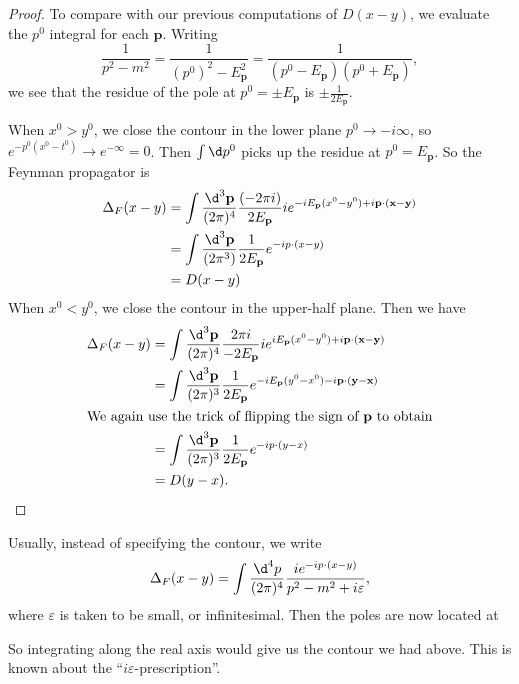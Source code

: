 \documentclass[a4paper]{article}
\begin{document}
\begin{proof}
  To compare with our previous computations of $D(x - y)$, we evaluate the $p^0$ integral for each $\mathbf{p}$. Writing
  \[
    \frac{1}{p^2 - m^2} = \frac{1}{(p^0)^2 - E_\mathbf{p}^2} = \frac{1}{(p^0 - E_\mathbf{p})(p^0 + E_\mathbf{p})},
  \]
  we see that the residue of the pole at $p^0 = \pm E_\mathbf{p}$ is $\pm \frac{1}{2E_\mathbf{p}}$.

  When $x^0 > y^0$, we close the contour in the lower plane $p^0 \to -i\infty$, so $e^{-p^0(x^0 - t^0)} \to e^{-\infty} = 0$. Then $\int \d p^0$ picks up the residue at $p^0 = E_\mathbf{p}$. So the Feynman propagator is
  \begin{align*}
    \Delta_F (x - y) &= \int \frac{\d ^3 \mathbf{p}}{(2\pi)^4} \frac{(-2\pi i)}{2E_\mathbf{p}} i e^{-iE_\mathbf{p}(x^0 - y^0) + i \mathbf{p} \cdot (\mathbf{x} - \mathbf{y})}\\
    &= \int \frac{\d^3 \mathbf{p}}{(2\pi^3)} \frac{1}{2 E_\mathbf{p}} e^{-ip \cdot (x - y)}\\
    &= D(x - y)
  \end{align*}
  When $x^0 < y^0$, we close the contour in the upper-half plane. Then we have
  \begin{align*}
    \Delta_F(x - y) &= \int \frac{\d^3 \mathbf{p}}{(2\pi)^4} \frac{2\pi i}{-2E_\mathbf{p}} i e^{iE_\mathbf{p} (x^0 - y^0) + i\mathbf{p} \cdot (\mathbf{x} - \mathbf{y})}\\
    &= \int \frac{\d^3 \mathbf{p}}{(2\pi)^3} \frac{1}{2E_\mathbf{p}} e^{-i E_\mathbf{p}(y^0 - x^0) - i \mathbf{p}\cdot (\mathbf{y} - \mathbf{x})}\\
    \intertext{We again use the trick of flipping the sign of $\mathbf{p}$ to obtain}
    &= \int \frac{\d^3 \mathbf{p}}{(2\pi)^3} \frac{1}{2E_\mathbf{p}} e^{-ip\cdot(y - x)}\\
    &= D(y - x). \qedhere
  \end{align*}
\end{proof}
Usually, instead of specifying the contour, we write
\[
  \Delta_F(x - y) = \int \frac{\d^4 p}{(2\pi)^4} \frac{i e^{-ip\cdot(x - y)}}{p^2 - m^2 + i \varepsilon},
\]
where $\varepsilon$ is taken to be small, or infinitesimal. Then the poles are now located at
\begin{center}
\end{center}
So integrating along the real axis would give us the contour we had above. This is known about the ``$i\varepsilon$-prescription''.
\end{document}
